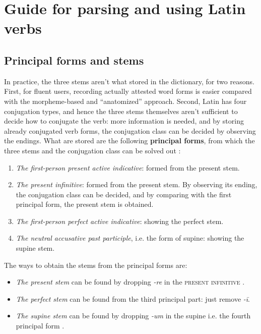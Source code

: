 \documentclass[a4paper, oneside]{report}
\newcommand*{\citesec}[1]{\S~{#1}}
\newcommand*{\concept}[1]{\textbf{#1}}
\newcommand{\corpus}[1]{\emph{#1}}
\newcommand*{\category}[1]{\textsc{#1}}
\begin{document}
\section{Guide for parsing and using Latin verbs}\label{sec:verb-inflection.parsing}

\subsection{Principal forms and stems}\label{sec:verb-inflection.parsing.principal-part}

In practice, the three stems aren't what stored in the dictionary,
for two reasons.
First, for fluent users,
recording actually attested word forms is easier
compared with the morpheme-based and ``anatomized'' approach.
Second, Latin has four conjugation types,
and hence the three stems themselves aren't sufficient to decide how to conjugate the verb:
more information is needed, 
and by storing already conjugated verb forms,
the conjugation class can be decided by observing the endings.
What are stored are the following \concept{principal forms},
from which the three stems and the conjugation class can be solved out
\citep[\citesec{172}]{allen1903allen}:
\begin{enumerate}
    \item \emph{The first-person present active indicative}: formed from the present stem.
    \item \emph{The present infinitive}: formed from the present stem. 
    By observing its ending, the conjugation class can be decided,
    and by comparing with the first principal form, 
    the present stem is obtained.
    \item \emph{The first-person perfect active indicative}: showing the perfect stem.
    \item \emph{The neutral accusative past participle}, i.e. the form of supine: showing the supine stem.
\end{enumerate}
The ways to obtain the stems from the principal forms are:
\begin{itemize}
    \item \emph{The present stem} can be found by dropping \corpus{-re} in the 
    \category{present infinitive}
    \citep[\citesec{175}]{allen1903allen}.
    \item \emph{The perfect stem} can be found from the third principal part:
    just remove \corpus{-ī}.
    \item \emph{The supine stem} can be found by dropping \corpus{-um} in the supine
    i.e. the fourth principal form
    \citep[\citesec{178}]{allen1903allen}.
\end{itemize}
\end{document}
